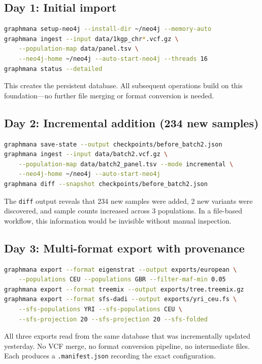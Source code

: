\documentclass[11pt,a4paper]{article}
\begin{document}
\subsection*{Day 1: Initial import}
\begin{lstlisting}[language=bash]
graphmana setup-neo4j --install-dir ~/neo4j --memory-auto
graphmana ingest --input data/1kgp_chr*.vcf.gz \
    --population-map data/panel.tsv \
    --neo4j-home ~/neo4j --auto-start-neo4j --threads 16
graphmana status --detailed
\end{lstlisting}

This creates the persistent database. All subsequent operations build on this foundation---no further file merging or format conversion is needed.

\subsection*{Day 2: Incremental addition (234 new samples)}
\begin{lstlisting}[language=bash]
graphmana save-state --output checkpoints/before_batch2.json
graphmana ingest --input data/batch2.vcf.gz \
    --population-map data/batch2_panel.tsv --mode incremental \
    --neo4j-home ~/neo4j --auto-start-neo4j
graphmana diff --snapshot checkpoints/before_batch2.json
\end{lstlisting}

The \texttt{diff} output reveals that 234 new samples were added, 2 new variants were discovered, and sample counts increased across 3 populations. In a file-based workflow, this information would be invisible without manual inspection.

\subsection*{Day 3: Multi-format export with provenance}
\begin{lstlisting}[language=bash]
graphmana export --format eigenstrat --output exports/european \
    --populations CEU --populations GBR --filter-maf-min 0.05
graphmana export --format treemix --output exports/tree.treemix.gz
graphmana export --format sfs-dadi --output exports/yri_ceu.fs \
    --sfs-populations YRI --sfs-populations CEU \
    --sfs-projection 20 --sfs-projection 20 --sfs-folded
\end{lstlisting}

All three exports read from the same database that was incrementally updated yesterday. No VCF merge, no format conversion pipeline, no intermediate files. Each produces a \texttt{.manifest.json} recording the exact configuration.
\end{document}

